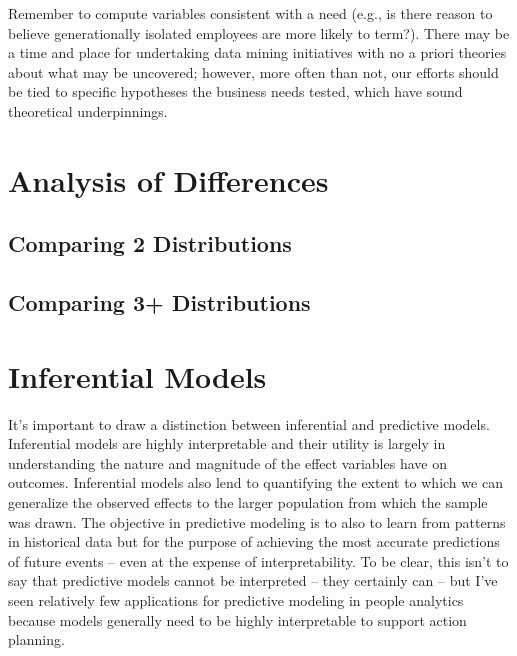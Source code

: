 \documentclass[]{book}
\begin{document}
Remember to compute variables consistent with a need (e.g., is there reason to believe generationally isolated employees are more likely to term?). There may be a time and place for undertaking data mining initiatives with no a priori theories about what may be uncovered; however, more often than not, our efforts should be tied to specific hypotheses the business needs tested, which have sound theoretical underpinnings.

\hypertarget{analysis-of-differences}{%
\chapter{Analysis of Differences}\label{analysis-of-differences}}

\hypertarget{comparing-2-distributions}{%
\section{Comparing 2 Distributions}\label{comparing-2-distributions}}

\hypertarget{comparing-3-distributions}{%
\section{Comparing 3+ Distributions}\label{comparing-3-distributions}}

\hypertarget{inferential-models}{%
\chapter{Inferential Models}\label{inferential-models}}

It's important to draw a distinction between inferential and predictive models. Inferential models are highly interpretable and their utility is largely in understanding the nature and magnitude of the effect variables have on outcomes. Inferential models also lend to quantifying the extent to which we can generalize the observed effects to the larger population from which the sample was drawn. The objective in predictive modeling is to also to learn from patterns in historical data but for the purpose of achieving the most accurate predictions of future events -- even at the expense of interpretability. To be clear, this isn't to say that predictive models cannot be interpreted -- they certainly can -- but I've seen relatively few applications for predictive modeling in people analytics because models generally need to be highly interpretable to support action planning.
\end{document}
